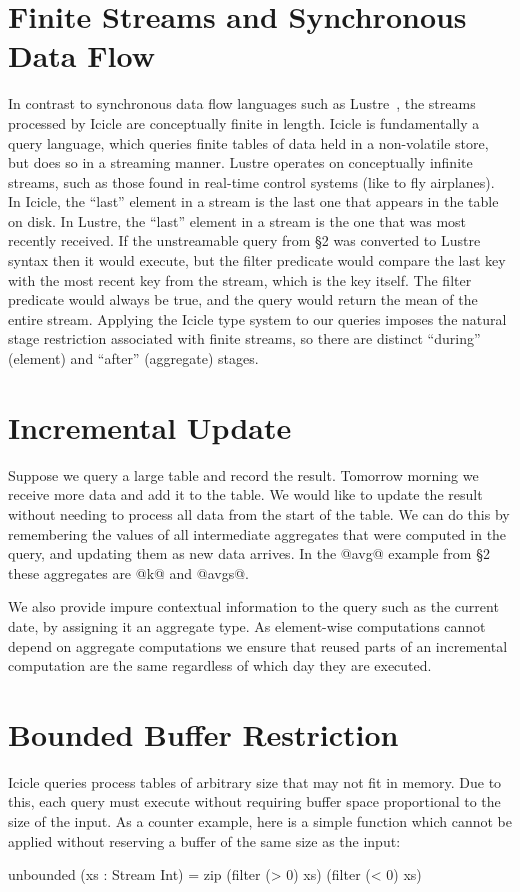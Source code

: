 \section{Finite Streams and Synchronous Data Flow}
In contrast to synchronous data flow languages such as {\sc Lustre}~\cite{halbwachs1991synchronous}, the streams processed by Icicle are conceptually finite in length. Icicle is fundamentally a query language, which queries finite tables of data held in a non-volatile store, but does so in a streaming manner. Lustre operates on conceptually infinite streams, such as those found in real-time control systems (like to fly airplanes). In Icicle, the ``last'' element in a stream is the last one that appears in the table on disk. In Lustre, the ``last'' element in a stream is the one that was most recently received. If the unstreamable query from \S2 was converted to Lustre syntax then it would execute, but the filter predicate would compare the last key with the most recent key from the stream, which is the key itself. The filter predicate would always be true, and the query would return the mean of the entire stream. Applying the Icicle type system to our queries imposes the natural stage restriction associated with finite streams, so there are distinct ``during'' (element) and ``after'' (aggregate) stages.


\section{Incremental Update}
Suppose we query a large table and record the result. Tomorrow morning we receive more data and add it to the table. We would like to update the result without needing to process all data from the start of the table. We can do this by remembering the values of all intermediate aggregates that were computed in the query, and updating them as new data arrives. In the @avg@ example from \S2 these aggregates are @k@ and @avgs@. 

We also provide impure contextual information to the query such as the current date, by assigning it an aggregate type. As element-wise computations cannot depend on aggregate computations we ensure that reused parts of an incremental computation are the same regardless of which day they are executed.


\section{Bounded Buffer Restriction}
\label{icicle:s:IcicleSource:bounded}
Icicle queries process tables of arbitrary size that may not fit in memory. Due to this, each query must execute without requiring buffer space proportional to the size of the input. As a counter example, here is a simple function which cannot be applied without reserving a buffer of the same size as the input:
\begin{code}
    unbounded (xs : Stream Int)
     = zip (filter (> 0) xs) (filter (< 0) xs)
\end{code}

